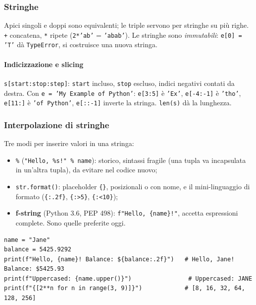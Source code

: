 \documentclass[a4paper,12pt]{article}
\begin{document}
\subsubsection{Stringhe}
Apici singoli e doppi sono equivalenti; le triple servono per stringhe su più righe.
\texttt{+} concatena, \texttt{*} ripete (\texttt{2*'ab'} = \texttt{'abab'}). Le stringhe
sono \emph{immutabili}: \texttt{e[0] = 'T'} dà \texttt{TypeError}, si costruisce una nuova
stringa.

\paragraph{Indicizzazione e slicing} \texttt{s[start:stop:step]}: \texttt{start} incluso,
\texttt{stop} escluso, indici negativi contati da destra. Con \texttt{e = 'My Example of Python'}:
\texttt{e[3:5]} è \texttt{'Ex'}, \texttt{e[-4:-1]} è \texttt{'tho'}, \texttt{e[11:]} è
\texttt{'of Python'}, \texttt{e[::-1]} inverte la stringa. \texttt{len(s)} dà la lunghezza.

\subsubsection{Interpolazione di stringhe}
Tre modi per inserire valori in una stringa:
\begin{itemize}[nosep]
  \item \texttt{\%} (\texttt{"Hello, \%s!" \% name}): storico, sintassi fragile (una tupla
        va incapsulata in un'altra tupla), da evitare nel codice nuovo;
  \item \texttt{str.format()}: placeholder \texttt{\{\}}, posizionali o con nome, e il
        mini-linguaggio di formato (\texttt{\{:.2f\}}, \texttt{\{:>5\}}, \texttt{\{:<10\}});
  \item \textbf{f-string} (Python 3.6, PEP 498): \texttt{f"Hello, \{name\}!"}, accetta
        espressioni complete. Sono quelle preferite oggi.
\end{itemize}
\begin{verbatim}
name = "Jane"
balance = 5425.9292
print(f"Hello, {name}! Balance: ${balance:.2f}")   # Hello, Jane! Balance: $5425.93
print(f"Uppercased: {name.upper()}")                # Uppercased: JANE
print(f"{[2**n for n in range(3, 9)]}")            # [8, 16, 32, 64, 128, 256]
\end{verbatim}
\end{document}
